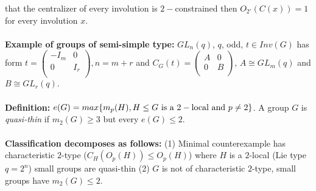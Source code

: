 that the centralizer of every involution is $2-$constrained then $O_{2'}(C(x))=1$ for
every involution $x$.
\\
\\
{\bf Example of groups of semi-simple type:} $GL_n(q)$, $q$, odd, $t \in Inv(G)$ has
form
$t= \left(
\begin{array}{cc}
-I_m & 0\\
0 & I_r\\
\end{array}
\right), n= m+r$ and
$C_G(t)= \left(
\begin{array}{cc}
A & 0\\
0 & B\\
\end{array}
\right)$,
$A \cong GL_m(q)$ and
$B \cong GL_r(q)$. \\
\\
{\bf Definition:}
$e(G)= max \{ m_p(H),
H \le G  \textnormal{ is a } 2-\textnormal{local and } p \ne 2 \}$.
A group $G$ is \emph{quasi-thin} if
$m_2(G) \ge 3$ but every $e(G) \le 2$.
\\
\\
{\bf Classification decomposes as follows:} (1) Minimal counterexample has characteristic
$2$-type ($C_H(O_p(H)) \le O_p(H)$) where $H$ is a $2$-local (Lie type $q= 2^n$) small
groups are quasi-thin (2) $G$ is not of characteristic $2$-type, small groups have
$m_2(G) \le 2$.
